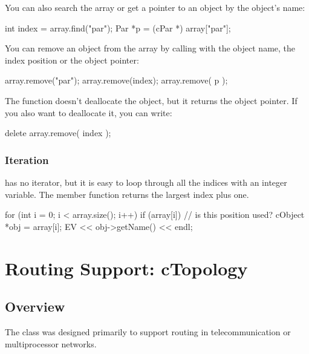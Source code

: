You can also search the array or get a pointer to an object by
the object's name:

\begin{cpp}
int index = array.find("par");
Par *p = (cPar *) array["par"];
\end{cpp}


You can remove an object from the array by calling 
with the object name, the index position or the object pointer:

\begin{cpp}
array.remove("par");
array.remove(index);
array.remove( p );
\end{cpp}


The  function doesn't deallocate the object, but it
returns the object pointer. If you also want to deallocate it, you can
write:

\begin{cpp}
delete array.remove( index );
\end{cpp}

\subsubsection{Iteration}


 has no iterator, but it is easy to loop through all the
indices with an integer variable. The  member function
returns the largest index plus one.

\begin{cpp}
for (int i = 0; i < array.size(); i++) {
  if (array[i]) { // is this position used?
    cObject *obj = array[i];
    EV << obj->getName() << endl;
  }
}
\end{cpp}




\section{Routing Support: cTopology}

\subsection{Overview}

The  class was designed primarily to support
routing in telecommunication or multiprocessor
networks.

